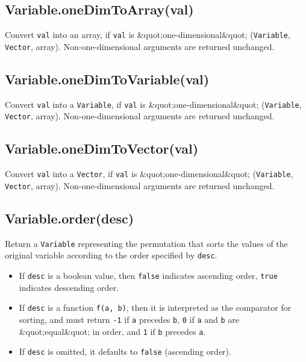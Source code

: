 \documentclass{article}
\begin{document}
    \subsection{Variable.oneDimToArray(val)}
    Convert \texttt{val} into an array, if \texttt{val} is \&quot;one-dimensional\&quot;
(\texttt{Variable}, \texttt{Vector}, array).
Non-one-dimensional arguments are returned unchanged.


    \subsection{Variable.oneDimToVariable(val)}
    Convert \texttt{val} into a \texttt{Variable}, if \texttt{val} is \&quot;one-dimensional\&quot;
(\texttt{Variable}, \texttt{Vector}, array).
Non-one-dimensional arguments are returned unchanged.


    \subsection{Variable.oneDimToVector(val)}
    Convert \texttt{val} into a \texttt{Vector}, if \texttt{val} is \&quot;one-dimensional\&quot;
(\texttt{Variable}, \texttt{Vector}, array).
Non-one-dimensional arguments are returned unchanged.


    \subsection{Variable.order(desc)}
    Return a \texttt{Variable} representing the permutation that sorts the values of the
original variable according to the order specified by \texttt{desc}.


\begin{itemize}

\item If \texttt{desc} is a boolean value, then \texttt{false} indicates ascending order, \texttt{true}
indicates descending order.

\item If \texttt{desc} is a function \texttt{f(a, b)}, then it is interpreted as the comparator
for sorting, and must return \texttt{-1} if \texttt{a} precedes \texttt{b}, \texttt{0} if \texttt{a} and \texttt{b} are \&quot;equal\&quot;
in order, and \texttt{1} if \texttt{b} precedes \texttt{a}.

\item If \texttt{desc} is omitted, it defaults to \texttt{false} (ascending order).

\end{itemize}
\end{document}
